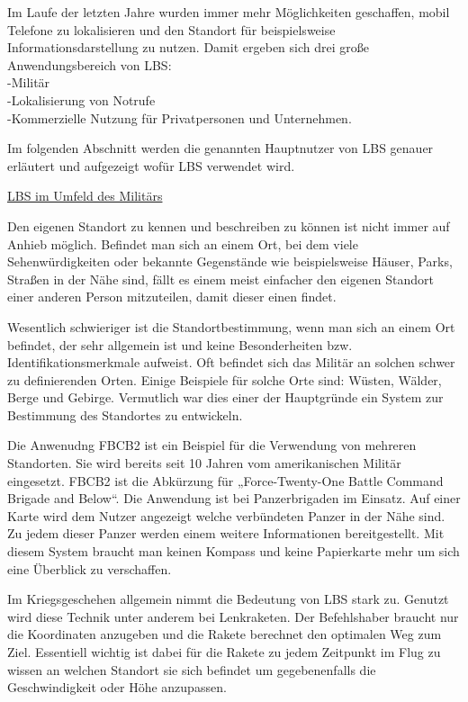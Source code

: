 Im Laufe der letzten Jahre wurden immer mehr Möglichkeiten geschaffen, mobil Telefone zu lokalisieren und den Standort für beispielsweise Informationsdarstellung zu nutzen. Damit ergeben sich drei große Anwendungsbereich von LBS:
\\-Militär
\\-Lokalisierung von Notrufe
\\-Kommerzielle Nutzung für Privatpersonen und Unternehmen.

Im folgenden Abschnitt werden die genannten Hauptnutzer von LBS genauer erläutert und aufgezeigt wofür LBS verwendet wird.


\underline{LBS im Umfeld des Militärs}

Den eigenen Standort zu kennen und beschreiben zu können ist nicht immer auf Anhieb möglich. Befindet man sich an einem Ort, bei dem viele Sehenwürdigkeiten oder bekannte Gegenstände wie beispielsweise Häuser, Parks, Straßen in der Nähe sind, fällt es einem meist einfacher den eigenen Standort einer anderen Person mitzuteilen, damit dieser einen findet.

Wesentlich schwieriger ist die Standortbestimmung, wenn man sich an einem Ort befindet, der sehr allgemein ist und keine Besonderheiten bzw. Identifikationsmerkmale aufweist. Oft befindet sich das Militär an solchen schwer zu definierenden Orten. Einige Beispiele für solche Orte sind: Wüsten, Wälder, Berge und Gebirge. Vermutlich war dies einer der Hauptgründe ein System zur Bestimmung des Standortes zu entwickeln. 

Die Anwenudng FBCB2 ist ein Beispiel für die Verwendung von mehreren Standorten. Sie wird bereits seit 10 Jahren vom amerikanischen Militär eingesetzt. FBCB2 ist die Abkürzung für „Force-Twenty-One Battle Command Brigade and Below“. Die Anwendung ist bei Panzerbrigaden im Einsatz. Auf einer Karte wird dem Nutzer angezeigt welche verbündeten Panzer in der Nähe sind. Zu jedem dieser Panzer werden einem weitere Informationen bereitgestellt. Mit diesem System braucht man keinen Kompass und keine Papierkarte mehr um sich eine Überblick zu verschaffen. \cite{FBCB} 

Im Kriegsgeschehen allgemein nimmt die Bedeutung von LBS stark zu. Genutzt wird diese Technik unter anderem bei Lenkraketen. Der Befehlshaber braucht nur die Koordinaten anzugeben und die Rakete berechnet den optimalen Weg zum Ziel. Essentiell wichtig ist dabei für die Rakete zu jedem Zeitpunkt im Flug zu wissen an welchen Standort sie sich befindet um gegebenenfalls die Geschwindigkeit oder Höhe anzupassen. 

